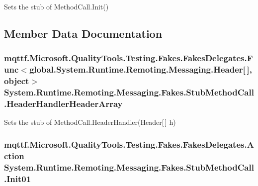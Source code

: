 Sets the stub of Method\-Call.\-Init()



\subsection{Member Data Documentation}
\hypertarget{class_system_1_1_runtime_1_1_remoting_1_1_messaging_1_1_fakes_1_1_stub_method_call_a143d68d5d711d2d4da524be5cd019ff7}{
\subsubsection[{Header\-Handler\-Header\-Array}]{\setlength{\rightskip}{0pt plus 5cm}mqttf.\-Microsoft.\-Quality\-Tools.\-Testing.\-Fakes.\-Fakes\-Delegates.\-Func$<$global.\-System.\-Runtime.\-Remoting.\-Messaging.\-Header\mbox{[}$\,$\mbox{]}, object$>$ System.\-Runtime.\-Remoting.\-Messaging.\-Fakes.\-Stub\-Method\-Call.\-Header\-Handler\-Header\-Array}}\label{class_system_1_1_runtime_1_1_remoting_1_1_messaging_1_1_fakes_1_1_stub_method_call_a143d68d5d711d2d4da524be5cd019ff7}


Sets the stub of Method\-Call.\-Header\-Handler(\-Header\mbox{[}$\,$\mbox{]} h)

\hypertarget{class_system_1_1_runtime_1_1_remoting_1_1_messaging_1_1_fakes_1_1_stub_method_call_a445d235c5b3d5c49dc54db5287cbee56}{
\subsubsection[{Init01}]{\setlength{\rightskip}{0pt plus 5cm}mqttf.\-Microsoft.\-Quality\-Tools.\-Testing.\-Fakes.\-Fakes\-Delegates.\-Action System.\-Runtime.\-Remoting.\-Messaging.\-Fakes.\-Stub\-Method\-Call.\-Init01}}\label{class_system_1_1_runtime_1_1_remoting_1_1_messaging_1_1_fakes_1_1_stub_method_call_a445d235c5b3d5c49dc54db5287cbee56}


